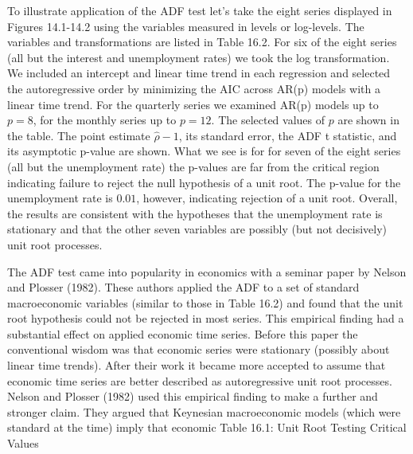 \documentclass[10pt]{article}
\begin{document}
To illustrate application of the ADF test let's take the eight series displayed in Figures 14.1-14.2 using the variables measured in levels or log-levels. The variables and transformations are listed in Table 16.2. For six of the eight series (all but the interest and unemployment rates) we took the log transformation. We included an intercept and linear time trend in each regression and selected the autoregressive order by minimizing the AIC across AR(p) models with a linear time trend. For the quarterly series we examined AR(p) models up to $p=8$, for the monthly series up to $p=12$. The selected values of $p$ are shown in the table. The point estimate $\widehat{\rho}-1$, its standard error, the ADF t statistic, and its asymptotic p-value are shown. What we see is for for seven of the eight series (all but the unemployment rate) the p-values are far from the critical region indicating failure to reject the null hypothesis of a unit root. The p-value for the unemployment rate is $0.01$, however, indicating rejection of a unit root. Overall, the results are consistent with the hypotheses that the unemployment rate is stationary and that the other seven variables are possibly (but not decisively) unit root processes.

The ADF test came into popularity in economics with a seminar paper by Nelson and Plosser (1982). These authors applied the ADF to a set of standard macroeconomic variables (similar to those in Table 16.2) and found that the unit root hypothesis could not be rejected in most series. This empirical finding had a substantial effect on applied economic time series. Before this paper the conventional wisdom was that economic series were stationary (possibly about linear time trends). After their work it became more accepted to assume that economic time series are better described as autoregressive unit root processes. Nelson and Plosser (1982) used this empirical finding to make a further and stronger claim. They argued that Keynesian macroeconomic models (which were standard at the time) imply that economic Table 16.1: Unit Root Testing Critical Values
\end{document}

